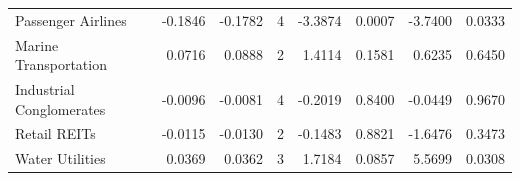 \begin{table}
\begin{tabular}{lrrrrrrr}
Passenger Airlines & -0.1846 & -0.1782 & 4 & -3.3874 & 0.0007 & -3.7400 & 0.0333 \\
Marine Transportation & 0.0716 & 0.0888 & 2 & 1.4114 & 0.1581 & 0.6235 & 0.6450 \\
Industrial Conglomerates & -0.0096 & -0.0081 & 4 & -0.2019 & 0.8400 & -0.0449 & 0.9670 \\
Retail REITs & -0.0115 & -0.0130 & 2 & -0.1483 & 0.8821 & -1.6476 & 0.3473 \\
Water Utilities & 0.0369 & 0.0362 & 3 & 1.7184 & 0.0857 & 5.5699 & 0.0308 \\
\bottomrule
\end{tabular}
\end{table}
